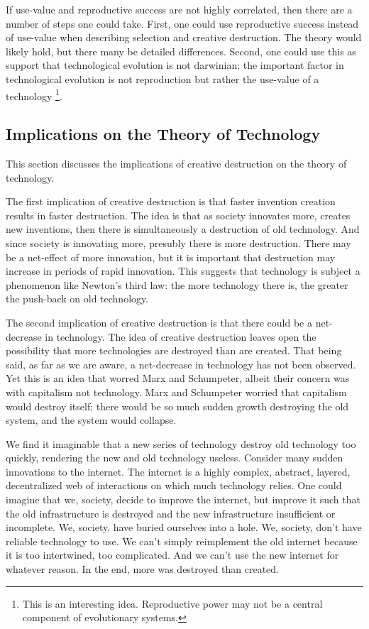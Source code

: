 \documentclass[11pt]{article}
\begin{document}
If use-value and reproductive success are not highly correlated, then there are a number of steps one could take.
First, one could use reproductive success instead of use-value when describing selection and creative destruction. 
The theory would likely hold, but there many be detailed differences. 
Second, one could use this as support that technological evolution is not darwinian: the important factor in technological evolution is not reproduction but rather the use-value of a technology
\footnote{This is an interesting idea. Reproductive power may not be a central component of evolutionary systems.}.

\subsection{Implications on the Theory of Technology}
This section discusses the implications of creative destruction on the theory of technology.

The first implication of creative destruction is that faster invention creation results in faster destruction.
The idea is that as society innovates more, creates new inventions, then there is simultaneously a destruction of old technology. 
And since society is innovating more, presubly there is more destruction.
There may be a net-effect of more innovation, but it is important that destruction may increase in periods of rapid innovation.
This suggests that technology is subject a phenomenon like Newton's third law: the more technology there is, the greater the push-back on old technology. 

The second implication of creative destruction is that there could be a net-decrease in technology. 
The idea of creative destruction leaves open the possibility that more technologies are destroyed than are created.
That being said, as far as we are aware, a net-decrease in technology has not been observed.
Yet this is an idea that worred Marx and Schumpeter, albeit their concern was with capitalism not technology.
Marx and Schumpeter worried that capitalism would destroy itself; there would be so much sudden growth destroying the old system, and the system would collapse.

We find it imaginable that a new series of technology destroy old technology too quickly, rendering the new and old technology useless.
Consider many sudden innovations to the internet.
The internet is a highly complex, abstract, layered, decentralized web of interactions on which much technology relies.
One could imagine that we, society, decide to improve the internet, but improve it such that the old infrastructure is destroyed and the new infrastructure insufficient or incomplete.
We, society, have buried ourselves into a hole.
We, society, don't have reliable technology to use. 
We can't simply reimplement the old internet because it is too intertwined, too complicated.
And we can't use the new internet for whatever reason.
In the end, more was destroyed than created.
\end{document}
